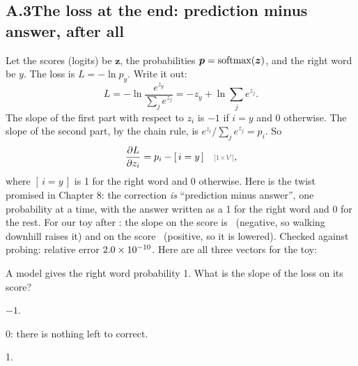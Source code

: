 
\subsection*{A.3\quad The loss at the end: prediction minus answer, after all}

Let the scores (logits) be $\bm{z}$, the probabilities $\bm{p}=\operatorname{softmax}(\bm{z})$, and the right word be $y$.
The loss is $L=-\ln p_y$. Write it out:
\[
L = -\ln\frac{e^{z_y}}{\sum_j e^{z_j}} = -z_y + \ln\sum_j e^{z_j}.
\]
The slope of the first part with respect to $z_i$ is $-1$ if $i=y$ and 0 otherwise. The slope of the second
part, by the chain rule, is $e^{z_i}/\sum_j e^{z_j} = p_i$. So
\[
\frac{\partial L}{\partial z_i} = p_i - [\,i=y\,] \shape{1\times V},
\]
where $[\,i=y\,]$ is 1 for the right word and 0 otherwise. Here is the twist promised in Chapter 8: the
correction \emph{is} ``prediction minus answer'', one probability at a time, with the answer written as a 1
for the right word and 0 for the rest. For our toy after : the slope on the 
score is \nAppAGradSorry\ (negative, so walking downhill raises it) and on the  score
\nAppAGradBeen\ (positive, so it is lowered). Checked against probing: relative error $2.0\times10^{-10}$.
Here are all three vectors for the toy:

\par\medskip\noindent\begin{minipage}{\linewidth}\centering
\fitR{}
\end{minipage}\par\medskip

\begin{checkq}
A model gives the right word probability 1. What is the slope of the loss on its score?
\begin{options}
\item $-1$.
\item 0: there is nothing left to correct.
\item 1.
\end{options}
\end{checkq}

